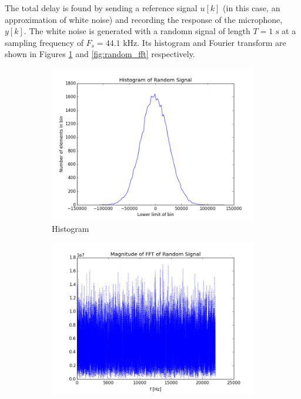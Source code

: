 The total delay is found by sending a reference signal $u[k]$ (in this case, an approximation of white noise) and recording the response of the microphone, $y[k]$. 
The white noise is generated with a randomn signal of length $T=1\text{ s}$ at a sampling frequency of $F_s=44.1 \text{ kHz}$. Its histogram and Fourier transform are shown in Figures \ref{fig:random_hist} and \ref{fig:random_fft} respectively. 

\begin{figure}[htb]
	\centering		
	\begin{subfigure}[b]{0.49\linewidth}
        \centering
		\includegraphics[width=\linewidth]{files/random_hist.png}
        \caption{Histogram}
        \label{fig:random_hist}
	\end{subfigure} 
	\begin{subfigure}[b]{0.49\linewidth}
        \centering
		\includegraphics[width=\linewidth]{files/random_fft.png}

\end{subfigure}
\end{figure}
